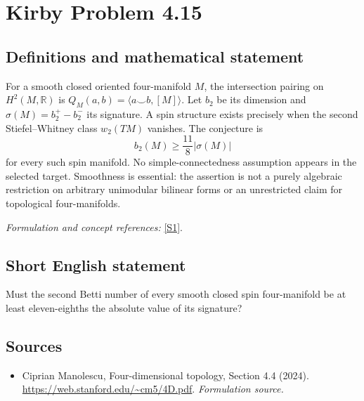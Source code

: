 \documentclass[11pt]{article}
\begin{document}
\section*{\texorpdfstring{Kirby Problem 4.15}{Kirby Problem 4.15}}\label{statement}
\subsection{Definitions and mathematical statement}
For a smooth closed oriented four-manifold $M$, the intersection pairing on
$H^2(M,{\mathbb{R}})$ is $Q_M(a,b)=\langle a\smile b,[M]\rangle$. Let $b_2$ be its dimension and $\sigma(M)=b_2^+-b_2^-$ its signature. A spin structure exists precisely when the second Stiefel--Whitney class $w_2(TM)$ vanishes. The conjecture is
\[
 b_2(M)\ge\frac{11}{8}|\sigma(M)|
\]
for every such spin manifold. No simple-connectedness assumption appears in the selected target. Smoothness is essential: the assertion is not a purely algebraic restriction on arbitrary unimodular bilinear forms or an unrestricted claim for topological four-manifolds.
\par\smallskip\textit{Formulation and concept references:} \href{https://web.stanford.edu/~cm5/4D.pdf}{[S1]}.

\subsection{Short English statement}
Must the second Betti number of every smooth closed spin four-manifold be at least eleven-eighths the absolute value of its signature?
\subsection{Sources}
\begin{itemize}
\item[S1]Ciprian Manolescu, Four-dimensional topology, Section 4.4 (2024).
\url{https://web.stanford.edu/~cm5/4D.pdf}.
\textit{Formulation source.}
\end{itemize}
\end{document}
